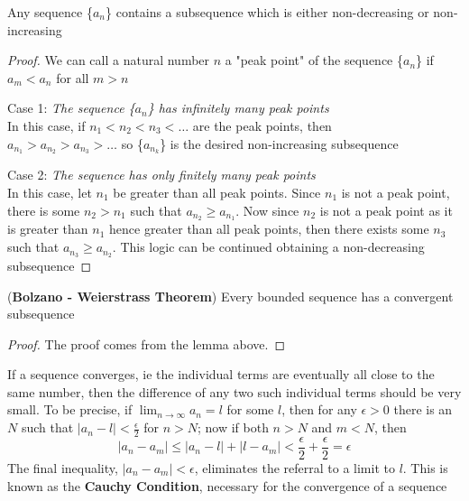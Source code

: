 \begin{lemma}
    Any sequence \{$a_n$\} contains a subsequence which is either non-decreasing or non-increasing
\end{lemma}
\begin{proof}
    We can call a natural number $n$ a "peak point" of the sequence \{$a_n$\} if $a_m < a_n$ for all $m > n$ \bigskip
    
    Case 1: \textit{The sequence \{$a_n$\} has infinitely many peak points} \\
    In this case, if $n_1 < n_2 < n_3 < \dots $ are the peak points, then \\ $a_{n_1} > a_{n_2} > a_{n_3} > \dots$ so \{$a_{n_k}$\} is the desired non-increasing subsequence \bigskip 

    Case 2: \textit{The sequence has only finitely many peak points} \\
    In this case, let $n_1$ be greater than all peak points. Since $n_1$ is not a peak point, there is some $n_2 > n_1$ such that $a_{n_2} \geq a_{n_1}$. Now since $n_2$ is not a peak point as it is greater than $n_1$ hence greater than all peak points, then there exists some $n_3$ such that $a_{n_3} \geq a_{n_2}$. This logic can be continued obtaining a non-decreasing subsequence
\end{proof}

\begin{corollary}
    (\textbf{Bolzano - Weierstrass Theorem}) Every bounded sequence has a convergent subsequence
\end{corollary}
\begin{proof}
    The proof comes from the lemma above.
\end{proof} \bigskip

If a sequence converges, ie the individual terms are eventually all close to the same number, then the difference of any two such individual terms should be very small. To be precise, if $\lim_{n\to \infty}a_n = l$ for   some $l$, then for any $\epsilon>0$ there is an $N$ such that $|a_n - l| < \frac{\epsilon}{2}$ for $n > N$; now if both $n > N$ and $m < N$, then
$$|a_n-a_m| \leq |a_n-l|+|l-a_m| < \frac{\epsilon}{2} + \frac{\epsilon}{2} = \epsilon$$
The final inequality, $|a_n-a_m| < \epsilon$, eliminates the referral to a limit to $l$. This is known as the \textbf{Cauchy Condition}, necessary for the convergence of a sequence 

